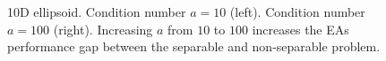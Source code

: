 \begin{figure}[h!]
\begin{minipage}[b]{0.5\linewidth}
 \centering
\end{minipage}
\begin{minipage}[b]{0.5\linewidth}
 \centering
\end{minipage}
\caption{10D ellipsoid. Condition number $a\!=\!10$ (left). Condition number $a\!=\!100$ (right). Increasing $a$ from $10$ to $100$  increases the EAs performance gap between the separable and non-separable problem.} 
\label{ellipse_t1}
\end{figure}

